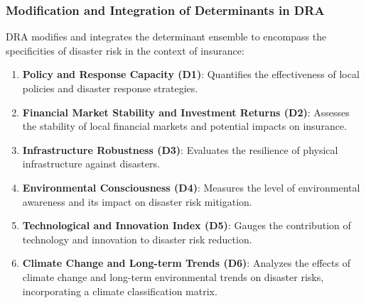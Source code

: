 \documentclass{mcmthesis}
\begin{document}
  
\subsubsection{Modification and Integration of Determinants in DRA}
DRA modifies and integrates the determinant ensemble to encompass the specificities of disaster risk in the context of insurance:
\begin{enumerate}
    \item \textbf{Policy and Response Capacity (D1)}: Quantifies the effectiveness of local policies and disaster response strategies.
    \item \textbf{Financial Market Stability and Investment Returns (D2)}: Assesses the stability of local financial markets and potential impacts on insurance.
    \item \textbf{Infrastructure Robustness (D3)}: Evaluates the resilience of physical infrastructure against disasters.
    \item \textbf{Environmental Consciousness (D4)}: Measures the level of environmental awareness and its impact on disaster risk mitigation.
    \item \textbf{Technological and Innovation Index (D5)}: Gauges the contribution of technology and innovation to disaster risk reduction.
    \item \textbf{Climate Change and Long-term Trends (D6)}: Analyzes the effects of climate change and long-term environmental trends on disaster risks, incorporating a climate classification matrix.
\end{enumerate}
\end{document}
